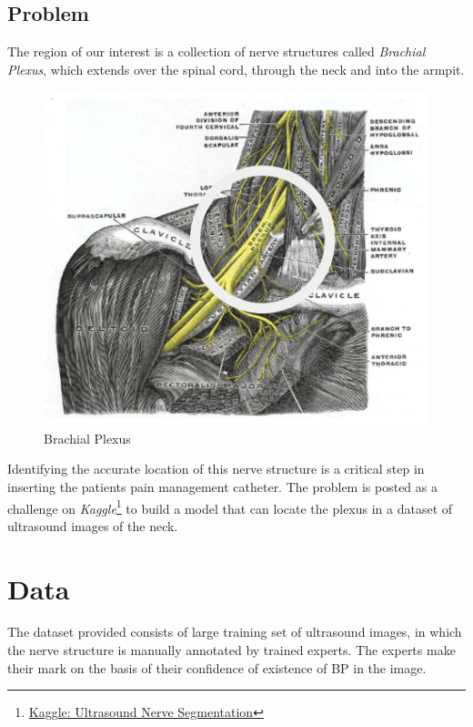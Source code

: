 \documentclass[12pt, a4paper]{article}
\begin{document}
\subsection{Problem}
The region of our interest is a collection of nerve structures called \emph{Brachial Plexus}, which extends over the spinal cord, through the neck and into the armpit. 
\begin{figure}[ht!]
\centering
\includegraphics[width=120mm]{Brachial_Plexus.jpg}
\caption[The LOF caption]{Brachial Plexus\footnotemark}
\end{figure}
Identifying the accurate location of this nerve structure is a critical step in inserting the patients pain management catheter. The problem is posted as a challenge on \emph{Kaggle}\footnote{\href{https://www.kaggle.com/c/ultrasound-nerve-segmentation/}{Kaggle: Ultrasound Nerve Segmentation}} to build a model that can locate the plexus in a dataset of ultrasound images of the neck.
\section{Data}
The dataset provided consists of large training set of ultrasound images, in which the nerve structure is manually annotated by trained experts. The experts make their mark on the basis of their confidence of existence of BP in the image.
\end{document}
